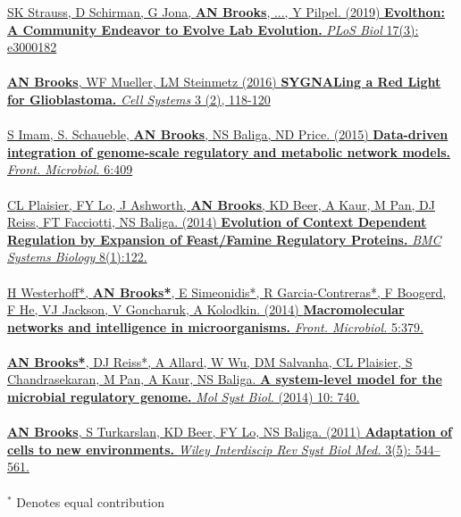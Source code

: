 \documentclass[usenames,dvipsnames]{friggeri-cv}
\begin{document}
\href{https://journals.plos.org/plosbiology/article?id=10.1371/journal.pbio.3000182}{\noindent
SK Strauss, D Schirman, G Jona, \textbf{AN Brooks}, ..., Y Pilpel. (2019)
\textbf{Evolthon: A Community Endeavor to Evolve Lab Evolution.}
\emph{PLoS Biol} 17(3): e3000182
}
\\
\\
\href{http://journal.frontiersin.org/article/10.3389/fmicb.2015.00409/abstract}{\noindent
\textbf{AN Brooks}, WF Mueller, LM Steinmetz (2016)
\textbf{SYGNALing a Red Light for Glioblastoma.}
\emph{Cell Systems}  3 (2), 118-120
}
\\
\\
\href{http://journal.frontiersin.org/article/10.3389/fmicb.2015.00409/abstract}{\noindent
S Imam, S. Schaueble,  \textbf{AN Brooks}, NS Baliga, ND Price. (2015)
\textbf{Data-driven integration of genome-scale regulatory and metabolic network models.}
\emph{Front. Microbiol.} 6:409
}
\\
\\
\href{http://www.biomedcentral.com/1752-0509/8/122}{\noindent
CL Plaisier, FY Lo, J Ashworth, \textbf{AN Brooks}, KD Beer, A Kaur, M Pan, DJ Reiss, FT Facciotti, NS Baliga. (2014)
\textbf{Evolution of Context Dependent Regulation by Expansion of Feast/Famine Regulatory Proteins.}
\emph{BMC Systems Biology} 8(1):122.
}
\\
\\
\href{http://journal.frontiersin.org/article/10.3389/fmicb.2014.00379/abstract}{\noindent
H Westerhoff*, \textbf{AN Brooks*}, E Simeonidis*, R Garcia-Contreras*, F Boogerd, F He, VJ Jackson, V Goncharuk, A Kolodkin. (2014)
\textbf{Macromolecular networks and intelligence in microorganisms.}
\emph{Front. Microbiol.} 5:379.
}
\\
\\
\href{http://msb.embopress.org/cgi/pmidlookup?view=long&pmid=25028489}{\noindent
\textbf{AN Brooks*}, DJ Reiss*, A Allard, W Wu, DM Salvanha, CL Plaisier, S Chandrasekaran, M Pan, A Kaur, NS Baliga.
\textbf{A system-level model for the microbial regulatory genome.}
\emph{Mol Syst Biol.} (2014) 10: 740.
}
\\
\\
\href{http://www.ncbi.nlm.nih.gov/pubmed/21197660}{\noindent
\textbf{AN Brooks}, S Turkarslan, KD Beer, FY Lo, NS Baliga. (2011)
\textbf{Adaptation of cells to new environments.}
\emph{Wiley Interdiscip Rev Syst Biol Med.} 3(5): 544–561.
}
\\
\\
$^{\ast}$ Denotes equal contribution
\end{document}
